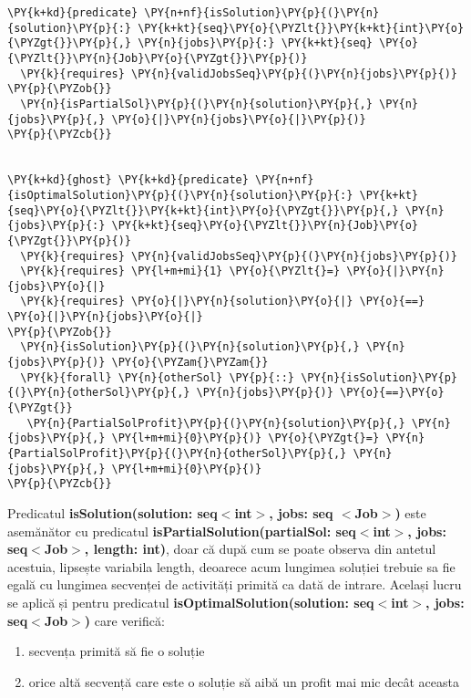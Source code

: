 \begin{Verbatim}[commandchars=\\\{\},fontsize=\small]
\PY{k+kd}{predicate} \PY{n+nf}{isSolution}\PY{p}{(}\PY{n}{solution}\PY{p}{:} \PY{k+kt}{seq}\PY{o}{\PYZlt{}}\PY{k+kt}{int}\PY{o}{\PYZgt{}}\PY{p}{,} \PY{n}{jobs}\PY{p}{:} \PY{k+kt}{seq} \PY{o}{\PYZlt{}}\PY{n}{Job}\PY{o}{\PYZgt{}}\PY{p}{)}
  \PY{k}{requires} \PY{n}{validJobsSeq}\PY{p}{(}\PY{n}{jobs}\PY{p}{)}
\PY{p}{\PYZob{}}
  \PY{n}{isPartialSol}\PY{p}{(}\PY{n}{solution}\PY{p}{,} \PY{n}{jobs}\PY{p}{,} \PY{o}{|}\PY{n}{jobs}\PY{o}{|}\PY{p}{)}
\PY{p}{\PYZcb{}}


\PY{k+kd}{ghost} \PY{k+kd}{predicate} \PY{n+nf}{isOptimalSolution}\PY{p}{(}\PY{n}{solution}\PY{p}{:} \PY{k+kt}{seq}\PY{o}{\PYZlt{}}\PY{k+kt}{int}\PY{o}{\PYZgt{}}\PY{p}{,} \PY{n}{jobs}\PY{p}{:} \PY{k+kt}{seq}\PY{o}{\PYZlt{}}\PY{n}{Job}\PY{o}{\PYZgt{}}\PY{p}{)}
  \PY{k}{requires} \PY{n}{validJobsSeq}\PY{p}{(}\PY{n}{jobs}\PY{p}{)}
  \PY{k}{requires} \PY{l+m+mi}{1} \PY{o}{\PYZlt{}=} \PY{o}{|}\PY{n}{jobs}\PY{o}{|}
  \PY{k}{requires} \PY{o}{|}\PY{n}{solution}\PY{o}{|} \PY{o}{==} \PY{o}{|}\PY{n}{jobs}\PY{o}{|}
\PY{p}{\PYZob{}}
  \PY{n}{isSolution}\PY{p}{(}\PY{n}{solution}\PY{p}{,} \PY{n}{jobs}\PY{p}{)} \PY{o}{\PYZam{}\PYZam{}}
  \PY{k}{forall} \PY{n}{otherSol} \PY{p}{::} \PY{n}{isSolution}\PY{p}{(}\PY{n}{otherSol}\PY{p}{,} \PY{n}{jobs}\PY{p}{)} \PY{o}{==}\PY{o}{\PYZgt{}}
   \PY{n}{PartialSolProfit}\PY{p}{(}\PY{n}{solution}\PY{p}{,} \PY{n}{jobs}\PY{p}{,} \PY{l+m+mi}{0}\PY{p}{)} \PY{o}{\PYZgt{}=} \PY{n}{PartialSolProfit}\PY{p}{(}\PY{n}{otherSol}\PY{p}{,} \PY{n}{jobs}\PY{p}{,} \PY{l+m+mi}{0}\PY{p}{)}
\PY{p}{\PYZcb{}}
\end{Verbatim}

Predicatul \textbf{isSolution(solution: seq$<$int$>$, jobs: seq $<$Job$>$)} este asemănător cu predicatul  \textbf{isPartialSolution(partialSol: seq$<$int$>$, jobs: seq$<$Job$>$, length: int)}, doar că după cum se poate observa din antetul acestuia, lipsește variabila length, deoarece acum lungimea soluției trebuie sa fie egală cu lungimea secvenței de activități primită  ca dată de intrare. Același lucru se aplică și pentru predicatul \textbf{isOptimalSolution(solution: seq$<$int$>$, jobs: seq$<$Job$>$)} care verifică:
\begin{enumerate}
    \item secvența primită  să fie o soluție 
    \item orice altă secvență care este o soluție să aibă un profit mai mic decât aceasta
\end{enumerate}

